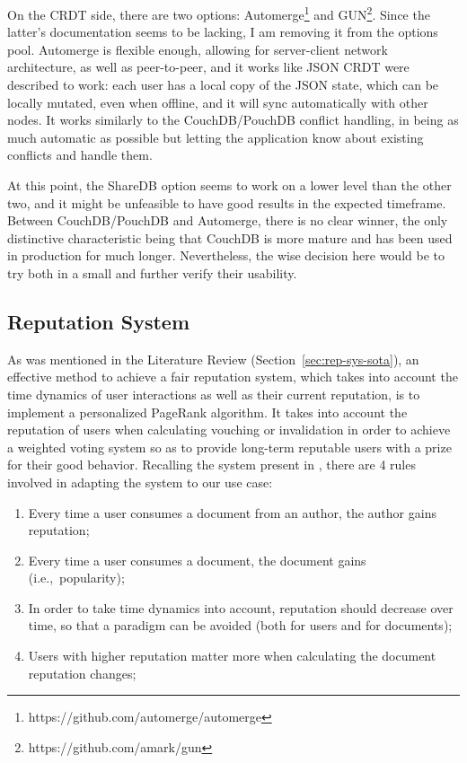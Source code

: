 On the CRDT side, there are two options: Automerge\footnote{https://github.com/automerge/automerge} and GUN\footnote{https://github.com/amark/gun}. Since the latter's documentation seems to be lacking, I am removing it from the options pool. Automerge is flexible enough, allowing for server-client network architecture, as well as peer-to-peer, and it works like JSON CRDT were described to work: each user has a local copy of the JSON state, which can be locally mutated, even when offline, and it will sync automatically with other nodes. It works similarly to the CouchDB/PouchDB conflict handling, in being as much automatic as possible but letting the application know about existing conflicts and handle them.

At this point, the ShareDB option seems to work on a lower level than the other two, and it might be unfeasible to have good results in the expected timeframe. Between CouchDB/PouchDB and Automerge, there is no clear winner, the only distinctive characteristic being that CouchDB is more mature and has been used in production for much longer. Nevertheless, the wise decision here would be to try both in a small  and further verify their usability. 

\subsection{Reputation System} \label{sec:problem-solution-rep-sys}
As was mentioned in the Literature Review (Section~\ref{sec:rep-sys-sota}), an effective method to achieve a fair reputation system, which takes into account the time dynamics of user interactions as well as their current reputation, is to implement a personalized PageRank algorithm. It takes into account the reputation of users when calculating vouching or invalidation in order to achieve a weighted voting system so as to provide long-term reputable users with a prize for their good behavior. Recalling the system present in \cite{Daly2009}, there are 4 rules involved in adapting the system to our use case:

\begin{enumerate}
    \item Every time a user consumes a document from an author, the author gains reputation;
    \item Every time a user consumes a document, the document gains  (i.e.,\ popularity);
    \item In order to take time dynamics into account, reputation should decrease over time, so that a  paradigm can be avoided (both for users and for documents);
    \item Users with higher reputation matter more when calculating the document reputation changes;
\end{enumerate}

